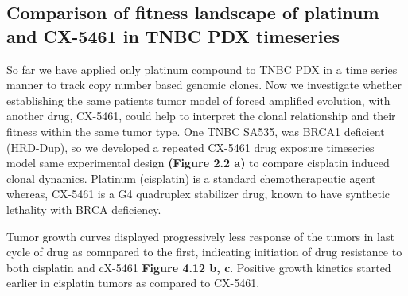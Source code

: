 \subsection{Comparison of fitness landscape of platinum and CX-5461 in TNBC PDX timeseries}
So far we have applied only platinum compound to TNBC PDX in a time series manner to track copy number based genomic clones. Now we investigate whether establishing the same patients tumor model of forced amplified evolution, with another drug, CX-5461, could help to interpret the clonal relationship and their fitness within the same tumor type.
One TNBC SA535, was BRCA1 deficient (HRD-Dup), so we developed a repeated CX-5461 drug exposure timeseries model same experimental design \textbf{(Figure 2.2 a)} to compare cisplatin induced clonal dynamics. Platinum (cisplatin) is a standard chemotherapeutic agent whereas, CX-5461 is a G4 quadruplex stabilizer drug, known to have synthetic lethality with BRCA deficiency.


Tumor growth curves displayed progressively less response of the tumors in last cycle of drug as comnpared to the first, indicating initiation of drug resistance to both cisplatin and cX-5461 \textbf{Figure 4.12 b, c}. Positive growth kinetics started earlier in cisplatin tumors as compared to CX-5461.

